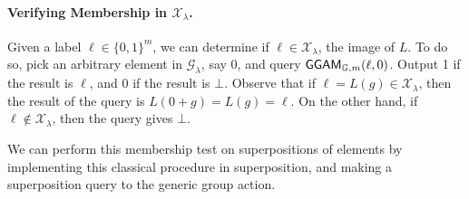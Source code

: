 \documentclass{article}\usepackage[a4paper,margin=20mm]{geometry}
\numberwithin{theorem}{section}
\numberwithin{equation}{section}
\newcommand{\G}{\mathbb{G}}
\newcommand{\Gs}{{\mathcal{G}}}
\newcommand{\Xs}{{\mathcal{X}}}
\newcommand{\GGAM}{{\sf GGAM}}
\begin{document}
\paragraph{Verifying Membership in $\Xs_\lambda$.} Given a label $\ell\in\{0,1\}^m$, we can determine if $\ell\in\Xs_\lambda$, the image of $L$. To do so, pick an arbitrary element in $\Gs_\lambda$, say $0$, and query $\GGAM_{\G,m}(\ell,0)$. Output 1 if the result is $\ell$, and 0 if the result is $\bot$. Observe that if $\ell=L(g)\in\Xs_\lambda$, then the result of the query is $L(0+g)=L(g)=\ell$. On the other hand, if $\ell\notin\Xs_\lambda$, then the query gives $\bot$.

We can perform this membership test on superpositions of elements by implementing this classical procedure in superposition, and making a superposition query to the generic group action.
\end{document}
